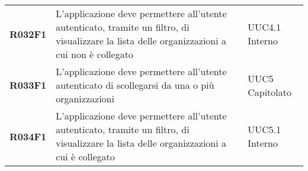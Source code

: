 \documentclass[../analisi-dei-requisiti.tex]{subfiles}
\begin{document}
\begin{longtable}[H]{>{\centering\bfseries}m{3cm} >{\centering}m{10cm} >{\centering\arraybackslash}m{3cm}}
  R032F1                               & L'applicazione deve permettere all'utente autenticato, tramite un filtro, di visualizzare la lista delle organizzazioni a cui non è collegato                                                           & UUC4.1 Interno                \\
  R033F1                               & L'applicazione deve permettere all'utente autenticato di scollegarsi da una o più organizzazioni                                                                                                        & UUC5 Capitolato               \\
  R034F1                               & L'applicazione deve permettere all'utente autenticato, tramite un filtro, di visualizzare la lista delle organizzazioni a cui è collegato                                                               & UUC5.1 Interno                \\


\end{longtable}
\end{document}

